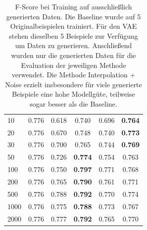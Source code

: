 \begin{table}[H]
{\begin{tabular}{l|c|c|c|c|c}
10                                                                           & 0.776    & 0.618 & 0.740                                                           & 0.696                                                           & \textbf{0.764} \\
20                                                                           & 0.776    & 0.670 & 0.748                                                           & 0.740                                                           & \textbf{0.773} \\
30                                                                           & 0.776    & 0.700 & 0.765                                                           & 0.744                                                           & \textbf{0.769} \\
50                                                                           & 0.776    & 0.726 & \textbf{0.774}                                                  & 0.754                                                           & 0.763          \\
100                                                                          & 0.776    & 0.750 & \textbf{0.797}                                                  & 0.771                                                           & 0.768          \\
200                                                                          & 0.776    & 0.765 & \textbf{0.790}                                                  & 0.761                                                           & 0.771          \\
500                                                                          & 0.776    & 0.788 & \textbf{0.792}                                                  & 0.770                                                           & 0.774          \\
1000                                                                         & 0.776    & 0.775 & \textbf{0.788}                                                  & 0.773                                                           & 0.767          \\
2000                                                                         & 0.776    & 0.777 & \textbf{0.792}                                                  & 0.765                                                           & 0.770          \\
\bottomrule
\end{tabular}}
\caption{F-Score bei Training auf ausschließlich generierten Daten. Die Baseline wurde auf 5 Originalbeispielen trainiert. Für den VAE stehen dieselben 5 Beispiele zur Verfügung um Daten zu generieren. Anschließend wurden nur die generierten Daten für die Evaluation der jeweiligen Methode verwendet. Die Methode Interpolation + Noise erzielt insbesondere für viele generierte Beispiele eine hohe Modellgüte, teilweise sogar besser als die Baseline.}
\label{tab:mnist_only_gen}
\end{table}

